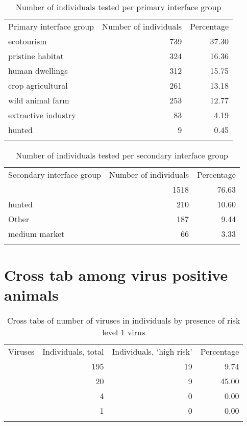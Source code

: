 \documentclass[11pt,article,oneside]{article}
\begin{document}
\begin{longtable}[c]{@{}lrr@{}}
\toprule\addlinespace
Primary interface group & Number of individuals & Percentage
\\\addlinespace
\midrule\endhead
ecotourism & 739 & 37.30
\\\addlinespace
pristine habitat & 324 & 16.36
\\\addlinespace
human dwellings & 312 & 15.75
\\\addlinespace
crop agricultural & 261 & 13.18
\\\addlinespace
wild animal farm & 253 & 12.77
\\\addlinespace
extractive industry & 83 & 4.19
\\\addlinespace
hunted & 9 & 0.45
\\\addlinespace
\bottomrule
\addlinespace
\caption{Number of individuals tested per primary interface group}
\end{longtable}

\begin{longtable}[c]{@{}lrr@{}}
\toprule\addlinespace
Secondary interface group & Number of individuals & Percentage
\\\addlinespace
\midrule\endhead
& 1518 & 76.63
\\\addlinespace
hunted & 210 & 10.60
\\\addlinespace
Other & 187 & 9.44
\\\addlinespace
medium market & 66 & 3.33
\\\addlinespace
\bottomrule
\addlinespace
\caption{Number of individuals tested per secondary interface group}
\end{longtable}

\section{Cross tab among virus positive
animals}\label{cross-tab-among-virus-positive-animals}

\begin{longtable}[c]{@{}rrrr@{}}
\toprule\addlinespace
Viruses & Individuals, total & Individuals, `high risk' & Percentage
\\\addlinespace
\midrule\endhead
1 & 195 & 19 & 9.74
\\\addlinespace
2 & 20 & 9 & 45.00
\\\addlinespace
3 & 4 & 0 & 0.00
\\\addlinespace
4 & 1 & 0 & 0.00
\\\addlinespace
\bottomrule
\addlinespace
\caption{Cross tabs of number of viruses in individuals by presence of
risk level 1 virus}
\end{longtable}
\end{document}

